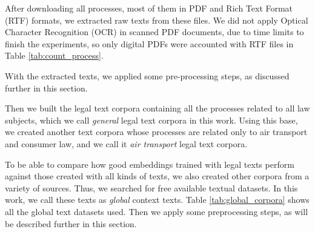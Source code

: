 After downloading all processes, most of them in PDF and Rich Text Format (RTF) formats, we extracted raw texts from these files. We did not apply Optical Character Recognition (OCR) in scanned PDF documents, due to time limits to finish the experiments, so only digital PDFs were accounted with RTF files in Table \ref{tab:count_process}. 

With the extracted texts, we applied some pre-processing steps, as discussed further in this section. 

Then we built the legal text corpora containing all the processes related to all law subjects, which we call \emph{general} legal text corpora in this work. Using this base, we created another text corpora whose processes are related only to air transport and consumer law, and we call it \emph{air transport} legal text corpora.

To be able to compare how good embeddings trained with legal texts perform against those created with all kinds of texts, we also created other corpora from a variety of sources. Thus, we searched for free available textual datasets. In this work, we call these texts as \emph{global} context texts. Table \ref{tab:global_corpora} shows all the global text datasets used. Then we apply some preprocessing steps, as will be described further in this section.

